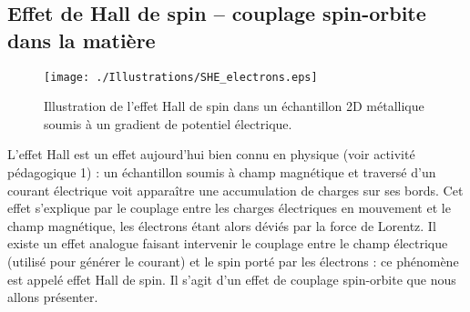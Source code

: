 \documentclass[a4paper,11pt]{article} %
\begin{document}
	
	\subsection{Effet de Hall de spin -- couplage spin-orbite dans la matière}
	
	\begin{figure}[h]
		\centering
		\begin{minipage}[c]{0.85\linewidth}
			\centering
			\texttt{[image: ./Illustrations/SHE\_electrons.eps]}
			\caption{Illustration de l'effet Hall de spin dans un échantillon 2D métallique soumis à un gradient de potentiel électrique.}
			\label{fig:spin-Hall-effect}
		\end{minipage}
	\end{figure}
	
	L'effet Hall est un effet aujourd'hui bien connu en physique (voir activité pédagogique 1) : un échantillon soumis à champ magnétique et traversé d'un courant électrique voit apparaître une accumulation de charges sur ses bords. Cet effet s'explique par le couplage entre les charges électriques en mouvement et le champ magnétique, les électrons étant alors déviés par la force de Lorentz. Il existe un effet analogue faisant intervenir le couplage entre le champ électrique (utilisé pour générer le courant) et le spin porté par les électrons : ce phénomène est appelé effet Hall de spin. Il s'agit d'un effet de couplage spin-orbite que nous allons présenter.\\ 
	
\end{document}
